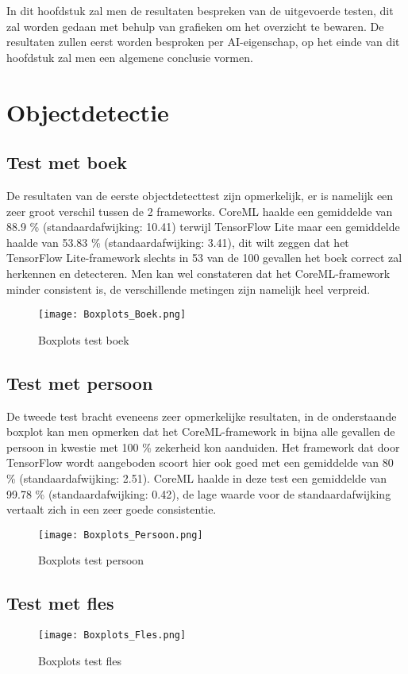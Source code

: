 In dit hoofdstuk zal men de resultaten bespreken van de uitgevoerde testen, dit zal worden gedaan met behulp van grafieken om het overzicht te bewaren. De resultaten zullen eerst worden besproken per AI-eigenschap, op het einde van dit hoofdstuk zal men een algemene conclusie vormen.

\section{Objectdetectie}

\subsection{Test met boek}
De resultaten van de eerste objectdetecttest zijn opmerkelijk, er is namelijk een zeer groot verschil tussen de 2 frameworks. CoreML haalde een gemiddelde van 88.9 \% (standaardafwijking: 10.41) terwijl TensorFlow Lite maar een gemiddelde haalde van 53.83 \% (standaardafwijking: 3.41), dit wilt zeggen dat het TensorFlow Lite-framework slechts in 53 van de 100 gevallen het boek correct zal herkennen en detecteren. Men kan wel constateren dat het CoreML-framework minder consistent is, de verschillende metingen zijn namelijk heel verpreid.

\begin{figure}[H]
	\centering
	\texttt{[image: Boxplots\_Boek.png]}
	\caption{Boxplots test boek}
\end{figure}
\subsection{Test met persoon}

De tweede test bracht eveneens zeer opmerkelijke resultaten, in de onderstaande boxplot kan men opmerken dat het CoreML-framework in bijna alle gevallen de persoon in kwestie met 100 \% zekerheid kon aanduiden. Het framework dat door TensorFlow wordt aangeboden scoort hier ook goed met een gemiddelde van 80 \% (standaardafwijking: 2.51). CoreML haalde in deze test een gemiddelde van 99.78 \% (standaardafwijking: 0.42), de lage waarde voor de standaardafwijking vertaalt zich in een zeer goede consistentie.
\begin{figure}[H]
	\centering
	\texttt{[image: Boxplots\_Persoon.png]}
	\caption{Boxplots test persoon}
\end{figure}
\subsection{Test met fles}
\begin{figure}[H]
	\centering
	\texttt{[image: Boxplots\_Fles.png]}
	\caption{Boxplots test fles}
\end{figure}
